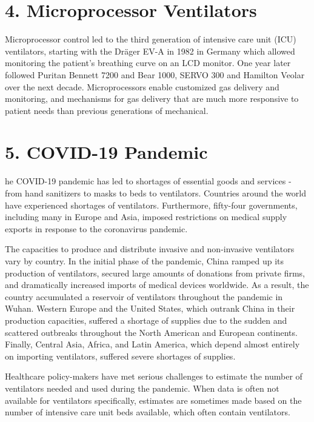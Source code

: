 \documentclass[12pt]{article}
\begin{document}
\section*{4.  Microprocessor Ventilators  }
Microprocessor control led to the third generation of intensive care unit (ICU) ventilators, starting with the Dräger EV-A in 1982 in Germany which allowed monitoring the patient's breathing curve on an LCD monitor. One year later followed Puritan Bennett 7200 and Bear 1000, SERVO 300 and Hamilton Veolar over the next decade. Microprocessors enable customized gas delivery and monitoring, and mechanisms for gas delivery that are much more responsive to patient needs than previous generations of mechanical.

\section*{5.  COVID-19 Pandemic  }
he COVID-19 pandemic has led to shortages of essential goods and services - from hand sanitizers to masks to beds to ventilators. Countries around the world have experienced shortages of ventilators. Furthermore, fifty-four governments, including many in Europe and Asia, imposed restrictions on medical supply exports in response to the coronavirus pandemic.

The capacities to produce and distribute invasive and non-invasive ventilators vary by country. In the initial phase of the pandemic, China ramped up its production of ventilators, secured large amounts of donations from private firms, and dramatically increased imports of medical devices worldwide. As a result, the country accumulated a reservoir of ventilators throughout the pandemic in Wuhan. Western Europe and the United States, which outrank China in their production capacities, suffered a shortage of supplies due to the sudden and scattered outbreaks throughout the North American and European continents. Finally, Central Asia, Africa, and Latin America, which depend almost entirely on importing ventilators, suffered severe shortages of supplies.

Healthcare policy-makers have met serious challenges to estimate the number of ventilators needed and used during the pandemic. When data is often not available for ventilators specifically, estimates are sometimes made based on the number of intensive care unit beds available, which often contain ventilators.

 
 
\end{document}
